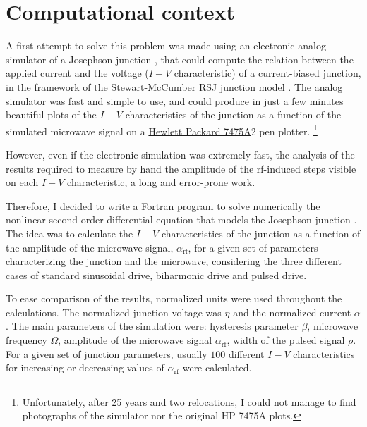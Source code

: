 \section{Computational context}
\label{computational-context}

A first attempt to solve this problem was made using an electronic analog simulator of a Josephson junction \cite {Henry:1981}, that could compute the relation between the applied current and the voltage ($I-V$ characteristic) of a current-biased junction, in the framework of the Stewart-McCumber RSJ junction model \cite{McCumber:1968, Stewart:1974}.
The analog simulator was fast and simple to use, and could produce in just a few minutes beautiful plots of the $I-V$ characteristics of the junction as a function of the simulated microwave signal on a \href{http://www.hpmuseum.net/display_item.php?hw=74}{Hewlett Packard 7475A}2 pen plotter.
\footnote{Unfortunately, after 25 years and two relocations, I could not manage to find photographs of the simulator nor the original HP 7475A plots.} 

However, even if the electronic simulation was extremely fast, the analysis of the results required to measure by hand the amplitude of the rf-induced steps visible on each $I-V$ characteristic, a long and error-prone work.

Therefore, I decided to write a Fortran program to solve numerically the nonlinear second-order differential equation that models the Josephson junction \cite{McCumber:1968, Stewart:1974}. 
The idea was to calculate the $I-V$ characteristics of the junction as a function of the amplitude of the microwave signal, $\alpha_\mathrm{rf}$, for a given set of parameters characterizing the junction and the microwave, considering the three different cases of standard sinusoidal drive, biharmonic drive and pulsed drive.

To ease comparison of the results, normalized units were used throughout the calculations. The normalized junction voltage was $\eta$ and the normalized current $\alpha$.
The main parameters of the simulation were: hysteresis parameter $\beta$, microwave frequency $\Omega$, amplitude of the microwave signal $\alpha_\mathrm{rf}$, width of the pulsed signal $\rho$. 
For a given set of junction parameters, usually $100$ different $I-V$ characteristics for increasing or decreasing values of $\alpha_\mathrm{rf}$ were calculated.

